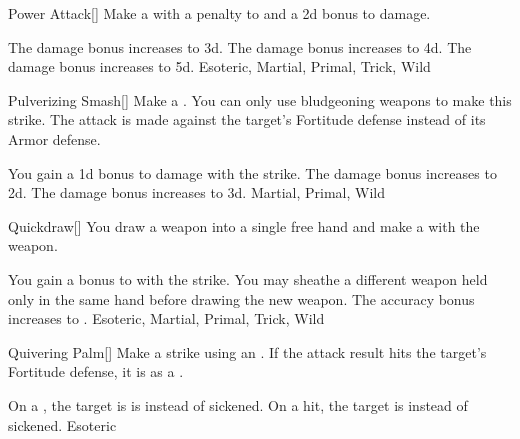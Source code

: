 \lowercase{\hypertarget{maneuver:Power Attack}{}}\label{maneuver:Power Attack}
\hypertarget{maneuver:Power Attack}{}
\begin{freeability}[Rank 1]{Power Attack}[]
Make a  with a  penalty to  and a \plus2d bonus to damage.

\rankline
{} The damage bonus increases to \plus3d.
 The damage bonus increases to \plus4d.
 The damage bonus increases to \plus5d.
 Esoteric, Martial, Primal, Trick, Wild
\end{freeability}
\vspace{0.25em}



\lowercase{\hypertarget{maneuver:Pulverizing Smash}{}}\label{maneuver:Pulverizing Smash}
\hypertarget{maneuver:Pulverizing Smash}{}
\begin{freeability}[Rank 1]{Pulverizing Smash}[]
Make a .
You can only use bludgeoning weapons to make this strike.
The attack is made against the target's Fortitude defense instead of its Armor defense.

\rankline
{} You gain a \plus1d bonus to damage with the strike.
 The damage bonus increases to \plus2d.
 The damage bonus increases to \plus3d.
 Martial, Primal, Wild
\end{freeability}
\vspace{0.25em}



\lowercase{\hypertarget{maneuver:Quickdraw}{}}\label{maneuver:Quickdraw}
\hypertarget{maneuver:Quickdraw}{}
\begin{freeability}[Rank 1]{Quickdraw}[]
You draw a weapon into a single free hand and make a  with the weapon.

\rankline
{} You gain a  bonus to  with the strike.
 You may sheathe a different weapon held only in the same hand before drawing the new weapon.
 The accuracy bonus increases to .
 Esoteric, Martial, Primal, Trick, Wild
\end{freeability}
\vspace{0.25em}



\lowercase{\hypertarget{maneuver:Quivering Palm}{}}\label{maneuver:Quivering Palm}
\hypertarget{maneuver:Quivering Palm}{}
\begin{freeability}[Rank 3]{Quivering Palm}[]
Make a strike using an .
If the attack result hits the target's Fortitude defense,
it is  as a .

\rankline
{} On a , the target is is  instead of sickened.
 On a hit, the target is  instead of sickened.
 Esoteric
\end{freeability}
\vspace{0.25em}



